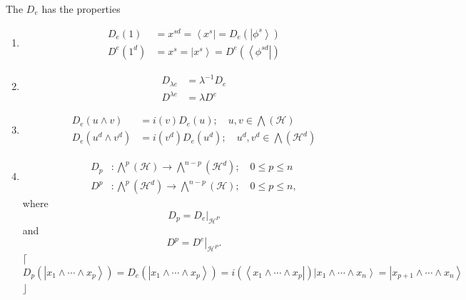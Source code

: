 \documentclass[aps,preprint]{revtex4}%
\begin{document}
The $D_{e}$ has the properties

\begin{enumerate}
\item
\begin{align}
D_{e}\left(  1\right)   &  =x^{sd}=\left\langle x^{s}\right\vert =D_{e}\left(
\left\vert \phi^{s}\right\rangle \right) \\
D^{e}\left(  1^{d}\right)   &  =x^{s}=\left\vert x^{s}\right\rangle
=D^{e}\left(  \left\langle \phi^{sd}\right\vert \right)
\end{align}


\item
\begin{align}
D_{\lambda e}  &  =\lambda^{-1}D_{e}\\
D^{\lambda e}  &  =\lambda D^{e}%
\end{align}


\item
\begin{align}
D_{e}\left(  u\wedge v\right)   &  =i\left(  v\right)  D_{e}\left(  u\right)
;\quad u,v\in%
{\textstyle\bigwedge}
\left(  \mathcal{H}\right) \\
D_{e}\left(  u^{d}\wedge v^{d}\right)   &  =i\left(  v^{d}\right)
D_{e}\left(  u^{d}\right)  ;\quad u^{d},v^{d}\in%
{\textstyle\bigwedge}
\left(  \mathcal{H}^{d}\right)
\end{align}


\item
\begin{align}
D_{p}  &  :%
{\textstyle\bigwedge\nolimits^{p}}
\left(  \mathcal{H}\right)  \rightarrow%
{\textstyle\bigwedge\nolimits^{n-p}}
\left(  \mathcal{H}^{d}\right)  ;\quad0\leq p\leq n\\
D^{p}  &  :%
{\textstyle\bigwedge\nolimits^{p}}
\left(  \mathcal{H}^{d}\right)  \rightarrow%
{\textstyle\bigwedge\nolimits^{n-p}}
\left(  \mathcal{H}\right)  ;\quad0\leq p\leq n,
\end{align}
where
\begin{equation}
D_{p}=\left.  D_{e}\right\vert _{\mathcal{H}^{P}}%
\end{equation}
and
\begin{equation}
D^{p}=\left.  D^{e}\right\vert _{\mathcal{H}^{P}}.
\end{equation}
$\lceil$%
\begin{equation}
D_{p}\left(  \left\vert x_{1}\wedge\cdots\wedge x_{p}\right\rangle \right)
=D_{e}\left(  \left\vert x_{1}\wedge\cdots\wedge x_{p}\right\rangle \right)
=i\left(  \left\langle x_{1}\wedge\cdots\wedge x_{p}\right\vert \right)
\left\vert x_{1}\wedge\cdots\wedge x_{n}\right\rangle =\left\vert
x_{p+1}\wedge\cdots\wedge x_{n}\right\rangle
\end{equation}
$\rfloor$
\end{enumerate}
\end{document}
